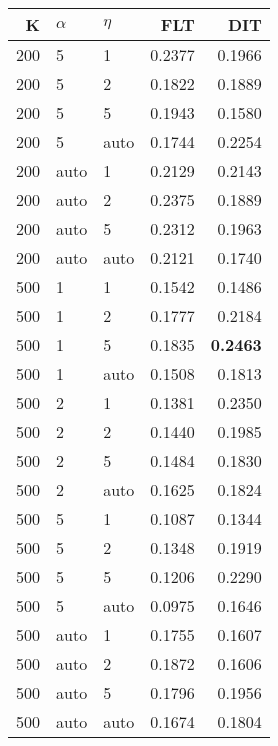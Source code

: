 \begin{table}
\begin{spacing}{1.2}
{\begin{tabular}{rll|rr}
\bottomrule
\end{tabular}
} \hfill \parbox{.45\linewidth}{\centering \begin{tabular}{rll|rr}
\toprule
   K & $\alpha$ &   $\eta$ & FLT &       DIT \\
\midrule
 200 &     5 &     1 &           0.2377 &       0.1966 \\
 200 &     5 &     2 &           0.1822 &       0.1889 \\
 200 &     5 &     5 &           0.1943 &       0.1580 \\
 200 &     5 &  auto &           0.1744 &       0.2254 \\
 200 &  auto &     1 &           0.2129 &       0.2143 \\
 200 &  auto &     2 &           0.2375 &       0.1889 \\
 200 &  auto &     5 &           0.2312 &       0.1963 \\
 200 &  auto &  auto &           0.2121 &       0.1740 \\
 500 &     1 &     1 &           0.1542 &       0.1486 \\
 500 &     1 &     2 &           0.1777 &       0.2184 \\
 500 &     1 &     5 &           0.1835 & {\bf 0.2463} \\
 500 &     1 &  auto &           0.1508 &       0.1813 \\
 500 &     2 &     1 &           0.1381 &       0.2350 \\
 500 &     2 &     2 &           0.1440 &       0.1985 \\
 500 &     2 &     5 &           0.1484 &       0.1830 \\
 500 &     2 &  auto &           0.1625 &       0.1824 \\
 500 &     5 &     1 &           0.1087 &       0.1344 \\
 500 &     5 &     2 &           0.1348 &       0.1919 \\
 500 &     5 &     5 &           0.1206 &       0.2290 \\
 500 &     5 &  auto &           0.0975 &       0.1646 \\
 500 &  auto &     1 &           0.1755 &       0.1607 \\
 500 &  auto &     2 &           0.1872 &       0.1606 \\
 500 &  auto &     5 &           0.1796 &       0.1956 \\
 500 &  auto &  auto &           0.1674 &       0.1804 \\
\bottomrule
\end{tabular}
}
\end{spacing}
\end{table}

